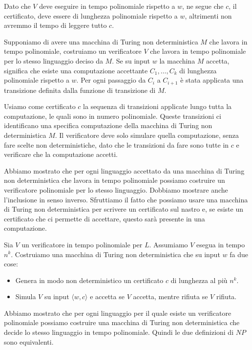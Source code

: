 Dato che $V$ deve eseguire in tempo polinomiale rispetto a $w$, ne segue che $c$, il certificato, deve essere di lunghezza polinomiale rispetto a $w$, altrimenti non avremmo il tempo di leggere tutto $c$.

Supponiamo di avere una macchina di Turing non deterministica $M$ che lavora in tempo polinomiale, costruiamo un verificatore $V$ che lavora in tempo polinomiale per lo stesso linguaggio deciso da $M$. Se su input $w$ la macchina $M$ accetta, significa che esiste una computazione accettante $C_1, \dots, C_k$ di lunghezza polinomiale rispetto a $w$. Per ogni passaggio da $C_i$ a $C_{i + 1}$ è stata applicata una transizione definita dalla funzione di transizione di $M$.

Usiamo come certificato $c$ la sequenza di transizioni applicate lungo tutta la computazione, le quali sono in numero polinomiale. Queste transizioni ci identificano una specifica computazione della macchina di Turing non deterministica $M$. Il verificatore deve solo simulare quella computazione, senza fare scelte non deterministiche, dato che le transizioni da fare sono tutte in $c$ e verificare che la computazione accetti.

Abbiamo mostrato che per ogni linguaggio accettato da una macchina di Turing non deterministica che lavora in tempo polinomiale possiamo costruire un verificatore polinomiale per lo stesso linguaggio. Dobbiamo mostrare anche l'inclusione in senso inverso. Sfruttiamo il fatto che possiamo usare una macchina di Turing non deterministica per scrivere un certificato sul nastro e, se esiste un certificato che ci permette di accettare, questo sarà presente in una computazione.

Sia $V$ un verificatore in tempo polinomiale per $L$. Assumiamo $V$ esegua in tempo $n^k$. Costruiamo una macchina di Turing non deterministica che su input $w$ fa due cose:
\begin{itemize}
    \item Genera in modo non deterministico un certificato $c$ di lunghezza al più $n^k$.
    \item Simula $V$ su input $\langle w, c \rangle$ e accetta se $V$ accetta, mentre rifiuta se $V$ rifiuta.
\end{itemize}

Abbiamo mostrato che per ogni linguaggio per il quale esiste un verificatore polinomiale possiamo costruire una
macchina di Turing non deterministica che decide lo stesso linguaggio in tempo polinomiale. Quindi le due definizioni di $NP$ sono equivalenti.

